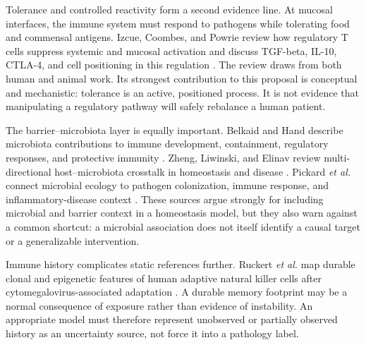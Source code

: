 \documentclass[conference]{IEEEtran}
\begin{document}
Tolerance and controlled reactivity form a second evidence line. At mucosal interfaces, the immune system must respond to pathogens while tolerating food and commensal antigens. Izcue, Coombes, and Powrie review how regulatory T cells suppress systemic and mucosal activation and discuss TGF-beta, IL-10, CTLA-4, and cell positioning in this regulation \cite{izcue2006}. The review draws from both human and animal work. Its strongest contribution to this proposal is conceptual and mechanistic: tolerance is an active, positioned process. It is not evidence that manipulating a regulatory pathway will safely rebalance a human patient.

The barrier--microbiota layer is equally important. Belkaid and Hand describe microbiota contributions to immune development, containment, regulatory responses, and protective immunity \cite{belkaid2014}. Zheng, Liwinski, and Elinav review multi-directional host--microbiota crosstalk in homeostasis and disease \cite{zheng2020}. Pickard \emph{et al.} connect microbial ecology to pathogen colonization, immune response, and inflammatory-disease context \cite{pickard2017}. These sources argue strongly for including microbial and barrier context in a homeostasis model, but they also warn against a common shortcut: a microbial association does not itself identify a causal target or a generalizable intervention.

Immune history complicates static references further. Ruckert \emph{et al.} map durable clonal and epigenetic features of human adaptive natural killer cells after cytomegalovirus-associated adaptation \cite{ruckert2022}. A durable memory footprint may be a normal consequence of exposure rather than evidence of instability. An appropriate model must therefore represent unobserved or partially observed history as an uncertainty source, not force it into a pathology label.
\end{document}

